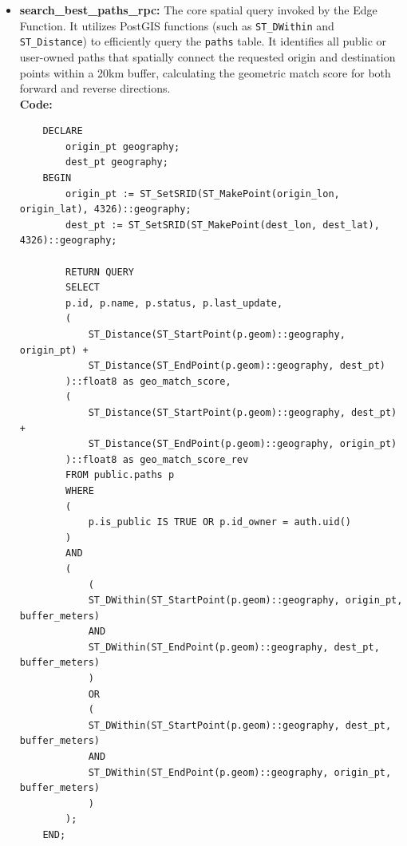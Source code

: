 \begin{itemize}
\begin{lstlisting}
    SELECT count(distinct user_id)
    INTO usage_count
    FROM activities
    WHERE path_id = p_path_id
    AND user_id != auth.uid(); 
    END;
    \end{lstlisting}
    
    \item \textbf{search\_best\_paths\_rpc:} 
    The core spatial query invoked by the Edge Function. It utilizes PostGIS functions (such as \texttt{ST\_DWithin} and \texttt{ST\_Distance}) to efficiently query the \texttt{paths} table. It identifies all public or user-owned paths that spatially connect the requested origin and destination points within a 20km buffer, calculating the geometric match score for both forward and reverse directions. \\
    \textbf{Code:}
    \begin{lstlisting}
    DECLARE
        origin_pt geography;
        dest_pt geography;
    BEGIN
        origin_pt := ST_SetSRID(ST_MakePoint(origin_lon, origin_lat), 4326)::geography;
        dest_pt := ST_SetSRID(ST_MakePoint(dest_lon, dest_lat), 4326)::geography;

        RETURN QUERY
        SELECT 
        p.id, p.name, p.status, p.last_update,
        (
            ST_Distance(ST_StartPoint(p.geom)::geography, origin_pt) +
            ST_Distance(ST_EndPoint(p.geom)::geography, dest_pt)
        )::float8 as geo_match_score,
        (
            ST_Distance(ST_StartPoint(p.geom)::geography, dest_pt) +
            ST_Distance(ST_EndPoint(p.geom)::geography, origin_pt)
        )::float8 as geo_match_score_rev
        FROM public.paths p
        WHERE 
        (
            p.is_public IS TRUE OR p.id_owner = auth.uid()
        )
        AND
        (
            (
            ST_DWithin(ST_StartPoint(p.geom)::geography, origin_pt, buffer_meters)
            AND
            ST_DWithin(ST_EndPoint(p.geom)::geography, dest_pt, buffer_meters)
            )
            OR 
            (
            ST_DWithin(ST_StartPoint(p.geom)::geography, dest_pt, buffer_meters)
            AND
            ST_DWithin(ST_EndPoint(p.geom)::geography, origin_pt, buffer_meters)
            )
        );
    END;
    \end{lstlisting}
\end{itemize}

